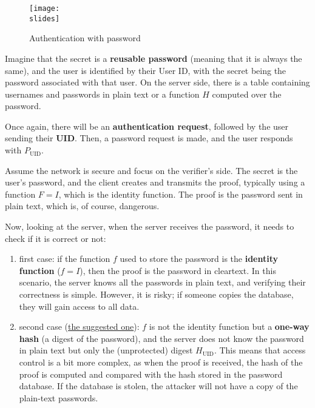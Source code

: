 \begin{figure}[h]
  \centering
  \texttt{[image: \\slides]}
  \caption{Authentication with password}
\end{figure}


Imagine that the secret is a \textbf{reusable password} (meaning that it is always the same), and the user is identified by their User ID, with the secret being the password associated with that user. On the server side, there is a table containing usernames and passwords in plain text or a function $H$ computed over the password.

Once again, there will be an \textbf{authentication request}, followed by the user sending their \textbf{UID}. Then, a password request is made, and the user responds with \textbf{$P_{\text{UID}}$}.

Assume the network is secure and focus on the verifier's side. The secret is the user's password, and the client creates and transmits the proof, typically using a function $F = I$, which is the identity function. The proof is the password sent in plain text, which is, of course, dangerous.

Now, looking at the server, when the server receives the password, it needs to check if it is correct or not:
\begin{enumerate}
  \item first case: if the function $f$ used to store the password is the \textbf{identity function} ($f = I$), then the proof is the password in cleartext. In this scenario, the server knows all the passwords in plain text, and verifying their correctness is simple. However, it is risky; if someone copies the database, they will gain access to all data.
  \item second case (\ul{the suggested one}): $f$ is not the identity function but a \textbf{one-way hash} (a digest of the password), and the server does not know the password in plain text but only the (unprotected) digest $H_{\mathrm{UID}}$. This means that access control is a bit more complex, as when the proof is received, the hash of the proof is computed and compared with the hash stored in the password database. If the database is stolen, the attacker will not have a copy of the plain-text passwords.
\end{enumerate}


